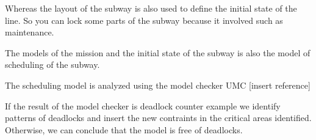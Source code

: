 
Whereas the layout of the subway is also used to define the initial state of the line. So you can lock some parts of the subway because it involved such as maintenance.


The models of the mission and the initial state of the subway is also the model of scheduling of the subway.

The scheduling model is analyzed using the model checker UMC [insert reference]


If the result of the model checker is deadlock counter example we identify patterns of deadlocks and insert the new contraints in the critical areas identified. Otherwise, we can conclude that the model is free of deadlocks.
